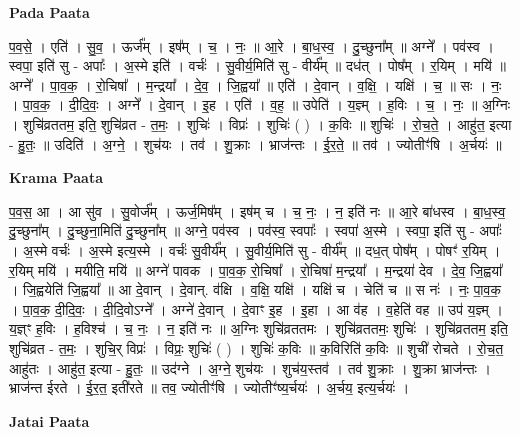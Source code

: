 \documentclass[17pt]{extarticle}
\begin{document}
\textbf{Pada Paata} \newline

प॒व॒से॒ । एति॑ । सु॒व॒ । ऊर्ज᳚म् । इष᳚म् । च॒ । नः॒ ॥ आ॒रे । बा॒ध॒स्व॒ । दु॒च्छुना᳚म् ॥ अग्ने᳚ । पव॑स्व । स्वपा॒ इति॑ सु - अपाः᳚ । अ॒स्मे इति॑ । वर्चः॑ । सु॒वीर्य॒मिति॑ सु - वीर्य᳚म् ॥ दध॑त् । पोष᳚म् । र॒यिम् । मयि॑ ॥ अग्ने᳚ । पा॒व॒क॒ । रो॒चिषा᳚ । म॒न्द्रया᳚ । दे॒व॒ । जि॒ह्वया᳚ ॥ एति॑ । दे॒वान् । व॒क्षि॒ । यक्षि॑ । च॒ ॥ सः । नः॒ । पा॒व॒क॒ । दी॒दि॒वः॒ । अग्ने᳚ । दे॒वान् । इ॒ह । एति॑ । व॒ह॒ ॥ उपेति॑ । य॒ज्ञ्म् । ह॒विः । च॒ । नः॒ ॥ अ॒ग्निः । शुचि॑व्रततम॒ इति॒ शुचि॑व्रत - त॒मः॒ । शुचिः॑ । विप्रः॑ । शुचिः॑ ( ) । क॒विः ॥ शुचिः॑ । रो॒च॒ते॒ । आहु॑त॒ इत्या - हु॒तः॒ ॥ उदिति॑ । अ॒ग्ने॒ । शुच॑यः । तव॑ । शु॒क्राः । भ्राज॑न्तः । ई॒र॒ते॒ ॥ तव॑ । ज्योतीꣳ॑षि । अ॒र्चयः॑ ॥  \newline


\textbf{Krama Paata} \newline

प॒व॒स॒ आ । आ सु॑व । सु॒वोर्ज᳚म् । ऊर्ज॒मिष᳚म् । इष॑म् च । च॒ नः॒ । न॒ इति॑ नः ॥ आ॒रे बा॑धस्व । बा॒ध॒स्व॒ दु॒च्छुना᳚म् । दु॒च्छुना॒मिति॑ दु॒च्छुना᳚म् ॥ अग्ने॒ पव॑स्व । पव॑स्व॒ स्वपाः᳚ । स्वपा॑ अ॒स्मे । स्वपा॒ इति॑ सु - अपाः᳚ । अ॒स्मे वर्चः॑ । अ॒स्मे इत्य॒स्मे । वर्चः॑ सु॒वीर्य᳚म् । सु॒वीर्य॒मिति॑ सु - वीर्य᳚म् ॥ दध॒त् पोष᳚म् । पोषꣳ॑ र॒यिम् । र॒यिम् मयि॑ । मयीति॒ मयि॑ ॥ अग्ने॑ पावक । पा॒व॒क॒ रो॒चिषा᳚ । रो॒चिषा॑ म॒न्द्रया᳚ । म॒न्द्रया॑ देव । दे॒व॒ जि॒ह्वया᳚ । जि॒ह्वयेति॑ जि॒ह्वया᳚ ॥ आ दे॒वान् । दे॒वान्. व॑क्षि । व॒क्षि॒ यक्षि॑ । यक्षि॑ च । चेति॑ च ॥ स नः॑ । नः॒ पा॒व॒क॒ । पा॒व॒क॒ दी॒दि॒वः॒ । दी॒दि॒वोऽग्ने᳚ । अग्ने॑ दे॒वान् । दे॒वाꣳ इ॒ह । इ॒हा । आ व॑ह । व॒हेति॑ वह ॥ उप॑ य॒ज्ञ्म् । य॒ज्ञ्ꣳ ह॒विः । ह॒विश्च॑ । च॒ नः॒ । न॒ इति॑ नः ॥ अ॒ग्निः शुचि॑व्रततमः । शुचि॑व्रततमः॒ शुचिः॑ । शुचि॑व्रततम॒ इति॒ शुचि॑व्रत - त॒मः॒ । शुचि॒र् विप्रः॑ । विप्रः॒ शुचिः॑ ( ) । शुचिः॑ क॒विः ॥ क॒विरिति॑ क॒विः ॥ शुची॑ रोचते । रो॒च॒त॒ आहु॑तः । आहु॑त॒ इत्या - हु॒तः॒ ॥ उद॑ग्ने । अ॒ग्ने॒ शुच॑यः । शुच॑य॒स्तव॑ । तव॑ शु॒क्राः । शु॒क्रा भ्राज॑न्तः । भ्राज॑न्त ईरते । ई॒र॒त॒ इती॑रते ॥ तव॒ ज्योतीꣳ॑षि । ज्योतीꣳ॑ष्य॒र्चयः॑ । अ॒र्चय॒ इत्य॒र्चयः॑ । \newline

\textbf{Jatai Paata} \newline
\end{document}
